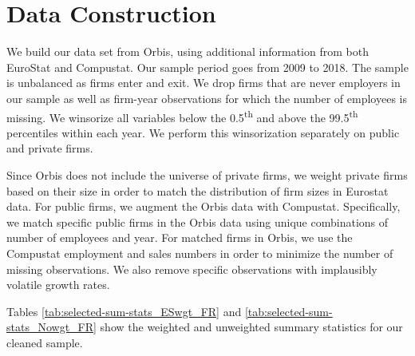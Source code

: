 \documentclass[12pt,notitlepage]{article}
\begin{document}



\FloatBarrier
\section{Data Construction} %
\label{sec:Data_Construction}
\FloatBarrier

We build our data set from Orbis, using additional information from both EuroStat and Compustat. Our sample period goes from 2009 to 2018. The sample is unbalanced as firms enter and exit. We drop firms that are never employers in our sample as well as firm-year observations for which the number of employees is missing. We winsorize all variables below the 0.5\textsuperscript{th} and above the 99.5\textsuperscript{th} percentiles within each year. We perform this winsorization separately on public and private firms.


Since Orbis does not include the universe of private firms, we weight private firms based on their size in order to match the distribution of firm sizes in Eurostat data. For public firms, we augment the Orbis data with Compustat. Specifically, we match specific public firms in the Orbis data using unique combinations of number of employees and year. For matched firms in Orbis, we use the Compustat employment and sales numbers in order to minimize the number of missing observations. We also remove specific observations with implausibly volatile growth rates.


Tables \ref{tab:selected-sum-stats_ESwgt_FR} and \ref{tab:selected-sum-stats_Nowgt_FR} show the weighted and unweighted summary statistics for our cleaned sample. 
\end{document}
